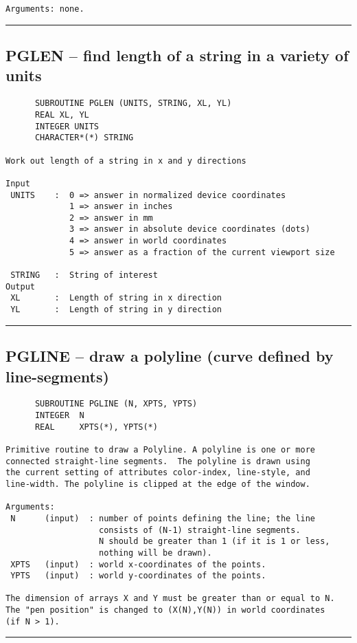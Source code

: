 {\begin{verbatim}
Arguments: none.
\end{verbatim}
\hrule


\subsection*{PGLEN -- find length of a string in a variety of units }
\begin{verbatim}
      SUBROUTINE PGLEN (UNITS, STRING, XL, YL)
      REAL XL, YL
      INTEGER UNITS
      CHARACTER*(*) STRING

Work out length of a string in x and y directions 

Input
 UNITS    :  0 => answer in normalized device coordinates
             1 => answer in inches
             2 => answer in mm
             3 => answer in absolute device coordinates (dots)
             4 => answer in world coordinates
             5 => answer as a fraction of the current viewport size

 STRING   :  String of interest
Output
 XL       :  Length of string in x direction
 YL       :  Length of string in y direction

\end{verbatim}
\hrule


\subsection*{PGLINE -- draw a polyline (curve defined by line-segments) }
\begin{verbatim}
      SUBROUTINE PGLINE (N, XPTS, YPTS)
      INTEGER  N
      REAL     XPTS(*), YPTS(*)

Primitive routine to draw a Polyline. A polyline is one or more
connected straight-line segments.  The polyline is drawn using
the current setting of attributes color-index, line-style, and
line-width. The polyline is clipped at the edge of the window.

Arguments:
 N      (input)  : number of points defining the line; the line
                   consists of (N-1) straight-line segments.
                   N should be greater than 1 (if it is 1 or less,
                   nothing will be drawn).
 XPTS   (input)  : world x-coordinates of the points.
 YPTS   (input)  : world y-coordinates of the points.

The dimension of arrays X and Y must be greater than or equal to N.
The "pen position" is changed to (X(N),Y(N)) in world coordinates
(if N > 1).
\end{verbatim}
\hrule


}
